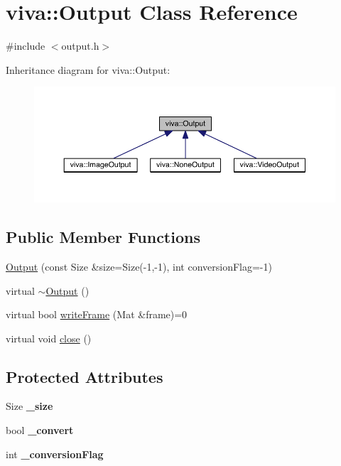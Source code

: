 \hypertarget{classviva_1_1_output}{}\section{viva\+:\+:Output Class Reference}
\label{classviva_1_1_output}


{\ttfamily \#include $<$output.\+h$>$}



Inheritance diagram for viva\+:\+:Output\+:
\nopagebreak
\begin{figure}[H]
\begin{center}
\leavevmode
\includegraphics[width=350pt]{classviva_1_1_output__inherit__graph}
\end{center}
\end{figure}
\subsection*{Public Member Functions}
\begin{DoxyCompactItemize}
\item 
\hyperlink{classviva_1_1_output_a184b70bb8e871a6e538e5dae1794de9a}{Output} (const Size \&size=Size(-\/1,-\/1), int conversion\+Flag=-\/1)
\item 
virtual \hyperlink{classviva_1_1_output_a54e4b6572be4e5c2affde8eead501a5d}{$\sim$\+Output} ()
\item 
virtual bool \hyperlink{classviva_1_1_output_ac74a311b4d151c5507d1351b7fc3426e}{write\+Frame} (Mat \&frame)=0
\item 
virtual void \hyperlink{classviva_1_1_output_a6fc610f298473208bf780ccec88dd018}{close} ()
\end{DoxyCompactItemize}
\subsection*{Protected Attributes}
\begin{DoxyCompactItemize}
\item 
Size {\bfseries \+\_\+size}\hypertarget{classviva_1_1_output_a8f7f08a43c3c7381420541faf65e940c}{}\label{classviva_1_1_output_a8f7f08a43c3c7381420541faf65e940c}

\item 
bool {\bfseries \+\_\+convert}\hypertarget{classviva_1_1_output_ac60b23056f3df565dec684751c3ada23}{}\label{classviva_1_1_output_ac60b23056f3df565dec684751c3ada23}

\item 
int {\bfseries \+\_\+conversion\+Flag}\hypertarget{classviva_1_1_output_ad65736a928c2aa6613276b6ee2ee8045}{}\label{classviva_1_1_output_ad65736a928c2aa6613276b6ee2ee8045}

\end{DoxyCompactItemize}



